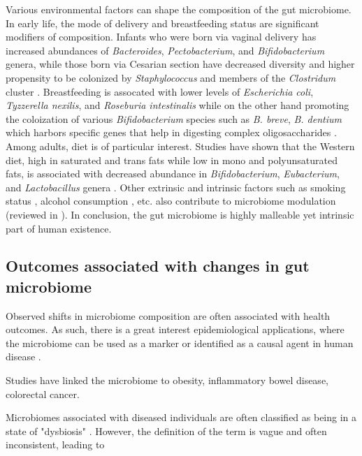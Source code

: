 Various environmental factors can shape the composition of the gut microbiome. In early life, the mode of delivery and breastfeeding status are significant modifiers of composition. Infants who were born via vaginal delivery has increased abundances of \emph{Bacteroides}, \emph{Pectobacterium}, and \emph{Bifidobacterium} genera, while those born via Cesarian section have decreased diversity and higher propensity to be colonized by \emph{Staphylococcus} and members of the \emph{Clostridum} cluster \cite{madan2016effects, kim2020delayed, stewart2018temporal}. Breastfeeding is assocated with lower levels of \emph{Escherichia coli}, \emph{Tyzzerella nexilis}, and \emph{Roseburia intestinalis} while on the other hand promoting the coloization of various \emph{Bifidobacterium} species such as \emph{B. breve}, \emph{B. dentium} which harbors specific genes that help in digesting complex oligosaccharides \cite{stewart2018temporal, vatanen2018human}. Among adults, diet is of particular interest. Studies have shown that the Western diet, high in saturated and trans fats while low in mono and polyunsaturated fats, is associated with decreased abundance in \emph{Bifidobacterium}, \emph{Eubacterium}, and \emph{Lactobacillus} genera \cite{wu2011linking}. Other extrinsic and intrinsic factors such as smoking status \cite{biedermann2013smoking}, alcohol consumption \cite{dubinkina2017links}, etc. also contribute to microbiome modulation (reviewed in \cite{schmidt2018humana}). In conclusion, the gut microbiome is highly malleable yet intrinsic part of human existence. 

\subsection{Outcomes associated with changes in gut microbiome}

Observed shifts in microbiome composition are often associated with health outcomes. As such, there is a great interest epidemiological applications, where the microbiome can be used as a marker or identified as a causal agent in human disease \cite{foxman2015use}. 

Studies have linked the microbiome to obesity, inflammatory bowel disease, colorectal cancer. 





Microbiomes associated with diseased individuals are often classified as being in a state of "dysbiosis" \cite{duvallet2017metaanalysis}. However, the definition of the term is vague and often inconsistent, leading to  


